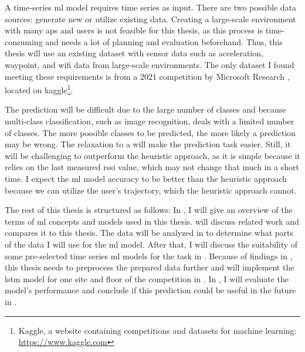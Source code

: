 A time-series \ac{ml} model requires time series as input.
There are two possible data sources: generate new or utilize existing data. 
Creating a large-scale environment with many \acp{ap} and users is not feasible for this thesis, as this process is time-consuming and needs a lot of planning and evaluation beforehand.
Thus, this thesis will use an existing dataset with sensor data such as acceleration, waypoint, and \ac{wifi} data from large-scale environments.
The only dataset I found meeting these requirements is from a 2021 competition by Microsoft Research \cite{IndoorLocationNavigation}, located on kaggle\footnote{Kaggle, a website containing competitions and datasets for machine learning: \url{https://www.kaggle.com}}.

The prediction will be difficult due to the large number of classes and because multi-class classification, such as image recognition, deals with a limited number of classes.
The more possible classes to be predicted, the more likely a prediction may be wrong.
The relaxation to a \threeAP will make the prediction task easier.
Still, it will be challenging to outperform the heuristic approach, as it is simple because it relies on the last measured \ac{rssi} value, which may not change that much in a short time. 
I expect the \ac{ml} model accuracy to be better than the heuristic approach because we can utilize the user's trajectory, which the heuristic approach cannot.

The rest of this thesis is structured as follows:
In , I will give an overview of the terms of \ac{ml} concepts and models used in this thesis.
 will discuss related work and compares it to this thesis.
The data will be analyzed in  to determine what parts of the data I will use for the \ac{ml} model.
After that, I will discuss the suitability of some pre-selected time series \ac{ml} models for the task in . 
Because of findings in , this thesis needs to preprocess the prepared data further and will implement the \ac{lstm} model for one site and floor of the competition in .
In , I will evaluate the model's performance and conclude if this prediction could be useful in the future in .
